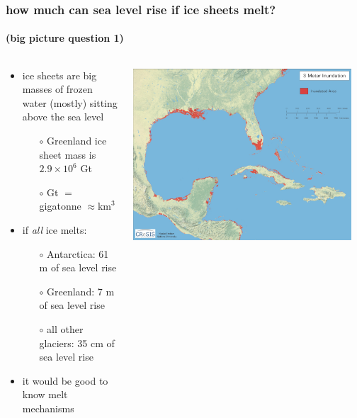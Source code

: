 \documentclass[10pt,hyperref={pdfpagelabels=true}]{beamer}
\begin{document}
\begin{frame}
  \frametitle{how much can sea level rise if ice sheets melt?}
  \framesubtitle{(big picture question 1)}

\begin{columns}
\begin{column}{0.6\textwidth}
\begin{itemize}
\item ice sheets are big masses of frozen water (mostly) sitting above the sea level
    \begin{itemize}
    \item[$\circ$] Greenland ice sheet mass is $2.9 \times 10^6$ Gt %
    \item[$\circ$] Gt $=$ gigatonne $\approx \text{km}^3$
    \end{itemize}
\item if \emph{all} ice melts:
    \begin{itemize}
    \item[$\circ$] Antarctica: 61 m of sea level rise
    \item[$\circ$] Greenland: 7 m of sea level rise
    \item[$\circ$] all other glaciers: 35 cm of sea level rise
    \end{itemize}
\item it would be good to know melt mechanisms
\end{itemize}
\end{column}
\begin{column}{0.4\textwidth}

\includegraphics[width=0.95\textwidth]{southeastern_us_3m}
\end{column}
\end{columns}
\end{frame}
\end{document}
